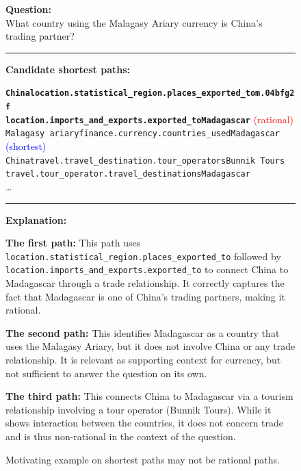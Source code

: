 \begin{figure}[t]
\begin{tcolorbox}[colback=gray!5!white,
                  colframe=gray!75!black,
                  title=WebQTrn-2591\_9f8fc8341d7c53fe16d94a6a23638ec4]
\scriptsize

\textbf{Question:}\\
What country using the Malagasy Ariary currency is China's trading partner?

\rule{\linewidth}{0.4pt}

\textbf{Candidate shortest paths:}\\[2pt]
{\raggedright
\texttt{\textbf{China\patharrow location.statistical\_region.places\_exported\_to\patharrow m.04bfg2f\patharrow \\  location.imports\_and\_exports.exported\_to\patharrow Madagascar}}\hfill
\textcolor{red}{(rational)}\\[6pt]

\texttt{Malagasy ariary\patharrow finance.currency.countries\_used\patharrow Madagascar}\hfill
\textcolor{blue}{(shortest)}\\[6pt]

\texttt{China\patharrow travel.travel\_destination.tour\_operators\patharrow Bunnik Tours\patharrow \\ travel.tour\_operator.travel\_destinations\patharrow Madagascar}\\[6pt]
\ldots
\par}

\rule{\linewidth}{0.4pt}

\textbf{Explanation:}\\[2pt]
{\raggedright
\textbf{The first path:} This path uses \texttt{location.statistical\_region.places\_exported\_to} followed by \texttt{location.imports\_and\_exports.exported\_to} to connect China to Madagascar through a trade relationship. It correctly captures the fact that Madagascar is one of China's trading partners, making it rational.\par\vspace{6pt}

\textbf{The second path:} This identifies Madagascar as a country that uses the Malagasy Ariary, but it does not involve China or any trade relationship. It is relevant as supporting context for currency, but not sufficient to answer the question on its own.\par\vspace{6pt}

\textbf{The third path:} This connects China to Madagascar via a tourism relationship involving a tour operator (Bunnik Tours). While it shows interaction between the countries, it does not concern trade and is thus non-rational in the context of the question.\par}

\end{tcolorbox}
\caption{Motivating example on shortest paths may not be rational paths.}
\label{fig:type2_no5}
\end{figure}


